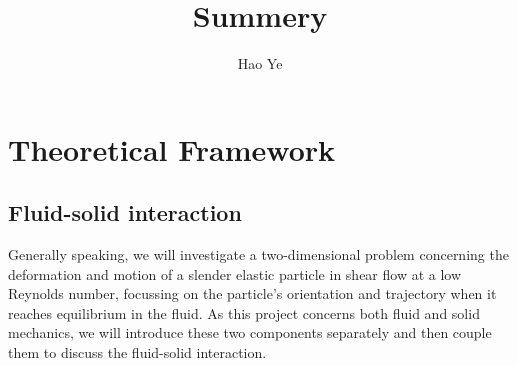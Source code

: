 \documentclass[a4paper,12pt]{report}
\title{Summery}
\author{Hao Ye} %
\begin{document}
\maketitle

\chapter{Theoretical Framework}

\section{Fluid-solid interaction}
Generally speaking, we will investigate a two-dimensional problem concerning the deformation and motion of a slender elastic particle in shear flow at a low Reynolds number, focussing on the particle's orientation and trajectory when it reaches equilibrium in the fluid. As this project concerns both fluid and solid mechanics, we will introduce these two components separately and then couple them to discuss the fluid-solid interaction.
\end{document}
